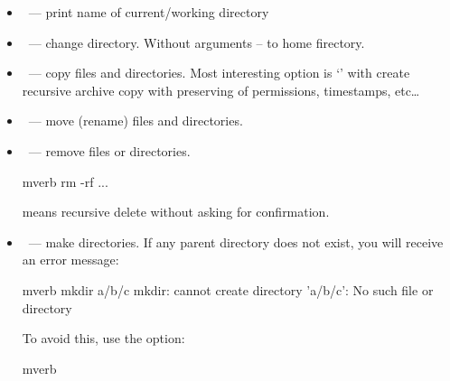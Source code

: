 \begin{itemize}
Also we can see directory listing recursively:
\begin{code}{mverb}
ls -R
\end{code}
Another very important option is the ``long list'' (``''):
\begin{code}{mverb}
ls -l
\end{code}
We see a table with information about the file/directory in the corresponding
lines.
\begin{itemize}
\item The first column is the file attribute. The first letter is the file
      type: ``\cmd{-}'' (``dash'') is a regular file, ``'' is a directory,
      and so on. Then we can see read, write, and execute permissions for three
      user groups: owner, owner group, and everyone else. Once again, we see
      the difference between UNIX and Microsoft. In the first case it is
      an attribute, in the second case executability is just a naming
      convention: '.com', '.exe', '.bat'.
\item Some mystery column that we will discuss later.
\item Then we can see owner and owner group, size of file, time of
      modification and the name of file. 
\end{itemize}
\item {}~--- print name of current/working directory
\item {}~--- change directory. Without arguments -- to home firectory.
\item {}~--- copy files and directories. Most interesting option
                   is `' with create recursive
                   archive copy with preserving of permissions, timestamps, etc\ldots
\item {}~--- move (rename) files and directories.
\item {}~--- remove files or directories.
\begin{code}{mverb}
rm -rf ...
\end{code}
means recursive delete without asking for confirmation.
\item {}~--- make directories. If any parent directory does not exist,
      you will receive an error message:
\begin{code}{mverb}
mkdir a/b/c
mkdir: cannot create directory 'a/b/c': No such file or directory
\end{code}
To avoid this, use the  option:
\begin{code}{mverb}

\end{code}
\end{itemize}
